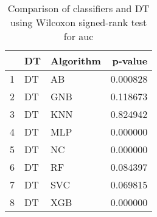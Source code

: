 \begin{table}
\footnotesize
\caption{Comparison of classifiers and DT using Wilcoxon signed-rank test for auc}
\label{tab:DT wilcoxon AUC comparison}
\begin{tabular}{lllr}
\hline
 & DT & Algorithm & p-value \\
\hline
1 & DT & AB & 0.000828 \\
2 & DT & GNB & 0.118673 \\
3 & DT & KNN & 0.824942 \\
4 & DT & MLP & 0.000000 \\
5 & DT & NC & 0.000000 \\
6 & DT & RF & 0.084397 \\
7 & DT & SVC & 0.069815 \\
8 & DT & XGB & 0.000000 \\
\hline
\end{tabular}
\end{table}
